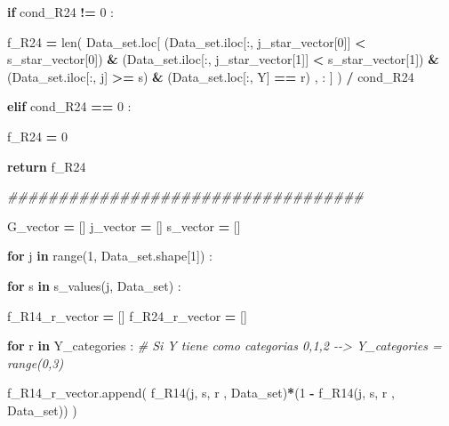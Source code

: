 \documentclass[
  11pt,
  a4paper,
]{article}
\newenvironment{Shaded}{\begin{snugshade}}{\end{snugshade}}
\newcommand{\BuiltInTok}[1]{#1}
\newcommand{\CommentTok}[1]{\textcolor[rgb]{0.56,0.35,0.01}{\textit{#1}}}
\newcommand{\ControlFlowTok}[1]{\textcolor[rgb]{0.13,0.29,0.53}{\textbf{#1}}}
\newcommand{\DecValTok}[1]{\textcolor[rgb]{0.00,0.00,0.81}{#1}}
\newcommand{\KeywordTok}[1]{\textcolor[rgb]{0.13,0.29,0.53}{\textbf{#1}}}
\newcommand{\NormalTok}[1]{#1}
\newcommand{\OperatorTok}[1]{\textcolor[rgb]{0.81,0.36,0.00}{\textbf{#1}}}
\newcommand{\StringTok}[1]{\textcolor[rgb]{0.31,0.60,0.02}{#1}}
\begin{document}
\begin{Shaded}
\begin{Highlighting}[]
            \ControlFlowTok{if}\NormalTok{  cond\_R24 }\OperatorTok{!=} \DecValTok{0}\NormalTok{ :}

\NormalTok{                f\_R24 }\OperatorTok{=} \BuiltInTok{len}\NormalTok{( Data\_set.loc[ (Data\_set.iloc[:, j\_star\_vector[}\DecValTok{0}\NormalTok{]] }\OperatorTok{\textless{}}\NormalTok{ s\_star\_vector[}\DecValTok{0}\NormalTok{]) }\OperatorTok{\&}\NormalTok{ (Data\_set.iloc[:, j\_star\_vector[}\DecValTok{1}\NormalTok{]] }\OperatorTok{\textless{}}\NormalTok{ s\_star\_vector[}\DecValTok{1}\NormalTok{]) }\OperatorTok{\&}\NormalTok{ (Data\_set.iloc[:, j] }\OperatorTok{\textgreater{}=}\NormalTok{ s) }\OperatorTok{\&}\NormalTok{ (Data\_set.loc[:, }\StringTok{\textquotesingle{}Y\textquotesingle{}}\NormalTok{] }\OperatorTok{==}\NormalTok{ r) , : ] ) }\OperatorTok{/}\NormalTok{ cond\_R24}

            
            \ControlFlowTok{elif}\NormalTok{ cond\_R24 }\OperatorTok{==} \DecValTok{0}\NormalTok{ :}

\NormalTok{                f\_R24 }\OperatorTok{=} \DecValTok{0}

            
            \ControlFlowTok{return}\NormalTok{ f\_R24 }


 \CommentTok{\#\#\#\#\#\#\#\#\#\#\#\#\#\#\#\#\#\#\#\#\#\#\#\#\#\#\#\#\#\#\#\#\#\#\#}

\NormalTok{        G\_vector }\OperatorTok{=}\NormalTok{ []}
\NormalTok{        j\_vector }\OperatorTok{=}\NormalTok{ []}
\NormalTok{        s\_vector }\OperatorTok{=}\NormalTok{ []}


        \ControlFlowTok{for}\NormalTok{ j }\KeywordTok{in} \BuiltInTok{range}\NormalTok{(}\DecValTok{1}\NormalTok{, Data\_set.shape[}\DecValTok{1}\NormalTok{]) :}

            \ControlFlowTok{for}\NormalTok{ s }\KeywordTok{in}\NormalTok{ s\_values(j, Data\_set) :}

 
\NormalTok{                f\_R14\_r\_vector }\OperatorTok{=}\NormalTok{ []}
\NormalTok{                f\_R24\_r\_vector }\OperatorTok{=}\NormalTok{ []}

                \ControlFlowTok{for}\NormalTok{ r }\KeywordTok{in}\NormalTok{ Y\_categories :  }\CommentTok{\# Si Y tiene como categorias 0,1,2 {-}{-}\textgreater{} Y\_categories = range(0,3)}

\NormalTok{                    f\_R14\_r\_vector.append( f\_R14(j, s, r , Data\_set)}\OperatorTok{*}\NormalTok{(}\DecValTok{1} \OperatorTok{{-}}\NormalTok{ f\_R14(j, s, r , Data\_set)) )}


\end{Highlighting}
\end{Shaded}
\end{document}
